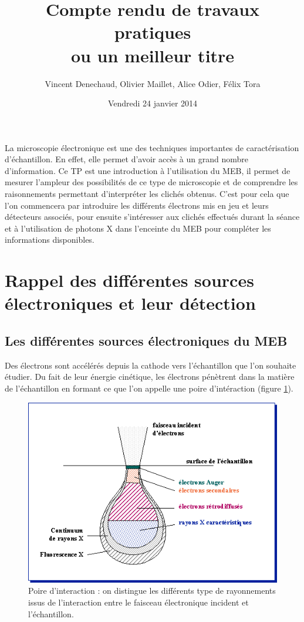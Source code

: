 \documentclass[a4paper,12pt]{article}
\title{Compte rendu de travaux pratiques\\ \small ou un meilleur titre}
\author{Vincent Denechaud, Olivier Maillet, Alice Odier, Félix Tora}
\date{Vendredi 24 janvier 2014}
\begin{document}
\maketitle

La microscopie électronique est une des techniques importantes de caractérisation d'échantillon. En effet, elle permet d'avoir accès à un grand nombre d'information. Ce TP est une introduction à l'utilisation du MEB, il permet de mesurer l'ampleur des possibilités de ce type de microscopie et de comprendre les raisonnements permettant d'interpréter les clichés obtenus. C'est pour cela que l'on commencera par introduire les différents électrons mis en jeu et leurs détecteurs associés, pour ensuite s'intéresser aux clichés effectués durant la séance et à l'utilisation de photons X dans l'enceinte du MEB pour compléter les informations disponibles.


\section{Rappel des différentes sources électroniques et leur détection}

\subsection{Les différentes sources électroniques du MEB}

Des électrons sont accélérés depuis la cathode vers l'échantillon que l'on souhaite étudier. Du fait de leur énergie cinétique, les électrons pénètrent dans la matière de l'échantillon en formant ce que l'on appelle une poire d'intéraction (figure \ref{fig:poire_int}).

\begin{figure}
\centering
\includegraphics[width = 0.8 \textwidth]{images/poire_int.png}
\caption{Poire d'interaction : on distingue les différents type de rayonnements issus de l'interaction entre le faisceau électronique incident et l'échantillon.}
\label{fig:poire_int}
\end{figure}
\end{document}
